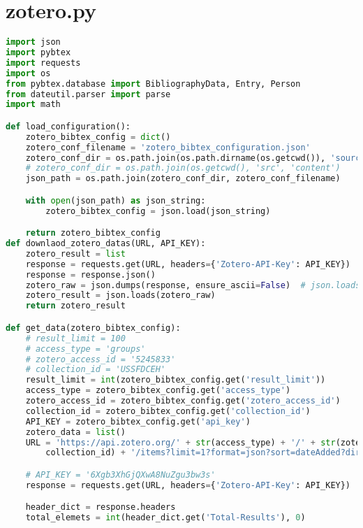 
\section{zotero.py}
\lstset{style=gra_codestyle}
\begin{lstlisting}[language=python, caption=Python LaTex - zotero.py - Zotero BibLaTex Importer,captionpos=b,label={lst:zotero},breaklines=true]
import json
import pybtex
import requests
import os
from pybtex.database import BibliographyData, Entry, Person
from dateutil.parser import parse
import math

def load_configuration():
    zotero_bibtex_config = dict()
    zotero_conf_filename = 'zotero_bibtex_configuration.json'
    zotero_conf_dir = os.path.join(os.path.dirname(os.getcwd()), 'source', 'configuration')
    # zotero_conf_dir = os.path.join(os.getcwd(), 'src', 'content')
    json_path = os.path.join(zotero_conf_dir, zotero_conf_filename)

    with open(json_path) as json_string:
        zotero_bibtex_config = json.load(json_string)

    return zotero_bibtex_config
def downlaod_zotero_datas(URL, API_KEY):
    zotero_result = list
    response = requests.get(URL, headers={'Zotero-API-Key': API_KEY})
    response = response.json()
    zotero_raw = json.dumps(response, ensure_ascii=False)  # json.loads(response)
    zotero_result = json.loads(zotero_raw)
    return zotero_result

def get_data(zotero_bibtex_config):
    # result_limit = 100
    # access_type = 'groups'
    # zotero_access_id = '5245833'
    # collection_id = 'USSFDCEH'
    result_limit = int(zotero_bibtex_config.get('result_limit'))
    access_type = zotero_bibtex_config.get('access_type')
    zotero_access_id = zotero_bibtex_config.get('zotero_access_id')
    collection_id = zotero_bibtex_config.get('collection_id')
    API_KEY = zotero_bibtex_config.get('api_key')
    zotero_data = list()
    URL = 'https://api.zotero.org/' + str(access_type) + '/' + str(zotero_access_id) + '/collections/' + str(
        collection_id) + '/items?limit=1?format=json?sort=dateAdded?direction=asc'

    # API_KEY = '6Xgb3XhGjQXwA8NuZgu3bw3s'
    response = requests.get(URL, headers={'Zotero-API-Key': API_KEY})

    header_dict = response.headers
    total_elemets = int(header_dict.get('Total-Results'), 0)


\end{lstlisting}
